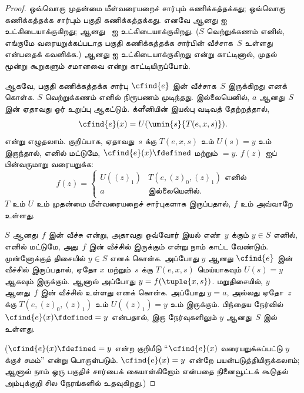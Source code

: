 \documentclass[../../../include/open-logic-section]{subfiles}
\begin{document}
\begin{proof}
ஒவ்வொரு முதன்மை மீள்வரையறைச் சார்பும் கணிக்கத்தக்கது; ஒவ்வொரு
கணிக்கத்தக்க சார்பும் பகுதி கணிக்கத்தக்கது. எனவே
 ஆனது  ஐ உட்கிடையாக்குகிறது;
 ஆனது~ ஐ உட்கிடையாக்குகிறது.
($S$ வெற்றுக்கணம் எனில், எங்குமே வரையறுக்கப்படாத பகுதி கணிக்கத்தக்க
சார்பின் வீச்சாக~$S$ உள்ளது என்பதைக் கவனிக்க.) 
ஆனது  ஐ உட்கிடையாக்குகிறது என்று காட்டினால்,
முதல் மூன்று கூறுகளும் சமானவை என்று காட்டியிருப்போம்.

ஆகவே, பகுதி கணிக்கத்தக்க சார்பு $\cfind{e}$ இன் வீச்சாக~$S$
இருக்கிறது எனக் கொள்க. $S$ வெற்றுக்கணம் எனில் நிரூபணம் முடிந்தது.
இல்லையெனில், $a$ ஆனது~$S$ இன் ஏதாவது ஓர் உறுப்பு ஆகட்டும்.
க்ளீனியின் இயல்பு வடிவத் தேற்றத்தால்,
\[
\cfind{e}(x) = U(\umin{s}{T(e, x, s)}).
\]
என்று எழுதலாம். குறிப்பாக, ஏதாவது~$s$ க்கு $T(e, x, s)$ உம்
$U(s) = y$ உம் இருந்தால், எனில் மட்டுமே,
$\cfind{e}(x) \fdefined$ மற்றும் $= y$. $f(z)$ ஐப் பின்வருமாறு வரையறுக்க:
\[
f(z) = \begin{cases}
  U((z)_1) & \text{$T(e, (z)_0, (z)_1)$ எனில்} \\
  a        & \text{இல்லையெனில்.}
\end{cases}
\]
$T$ உம் $U$ உம் முதன்மை மீள்வரையறைச் சார்புகளாக இருப்பதால்,
$f$ உம் அவ்வாறே உள்ளது. 

$S$ ஆனது~$f$ இன் வீச்சு என்று, அதாவது ஒவ்வோர் இயல் எண்~$y$ க்கும்
$y \in S$ எனில், எனில் மட்டுமே, அது~$f$ இன் வீச்சில் இருக்கும்
என்று நாம் காட்ட வேண்டும். முன்னோக்குத் திசையில் $y \in S$ எனக்
கொள்க. அப்போது $y$ ஆனது $\cfind{e}$ இன் வீச்சில் இருப்பதால்,
ஏதோ $x$ மற்றும்~$s$ க்கு $T(e,x,s)$ மெய்யாகவும் $U(s) = y$
ஆகவும் இருக்கும். ஆனால் அப்போது $y = f(\tuple{x,s})$. மறுதிசையில்,
$y$ ஆனது~$f$ இன் வீச்சில் உள்ளது எனக் கொள்க. அப்போது $y = a$,
அல்லது ஏதோ~$z$ க்கு $T(e,(z)_0,(z)_1)$ உம்
$U((z)_1) = y$ உம் இருக்கும். பிந்தைய நேர்வில்
$\cfind{e}(x) \fdefined = y$ என்பதால், இரு நேர்வுகளிலும் $y$ ஆனது~$S$ இல் உள்ளது.

($\cfind{e}(x) \fdefined = y$ என்ற குறியீடு
``$\cfind{e}(x)$ வரையறுக்கப்பட்டு $y$ க்குச் சமம்'' என்று
பொருள்படும். $\cfind{e}(x) = y$ என்றே பயன்படுத்தியிருக்கலாம்;
ஆனால் நாம் ஒரு பகுதிச் சார்பைக் கையாள்கிறோம் என்பதை நினைவூட்டக்
கூடுதல் அம்புக்குறி சில நேரங்களில் உதவுகிறது.)


\end{proof}
\end{document}
